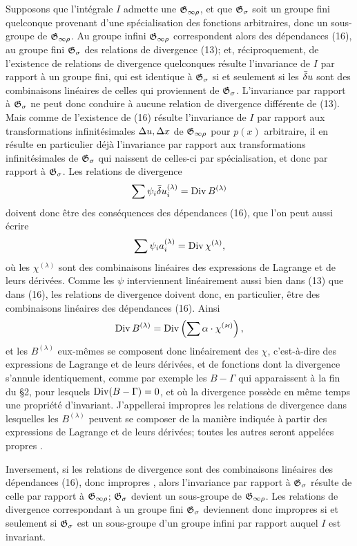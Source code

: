 Supposons que l'intégrale \(I\) admette une \(\mathfrak G_{\infty\rho}\), et que \(\mathfrak G_\sigma\) soit un groupe fini quelconque provenant d'une spécialisation des fonctions arbitraires, donc un sous-groupe de \(\mathfrak G_{\infty\rho}\). Au groupe infini \(\mathfrak G_{\infty\rho}\) correspondent alors des dépendances (16), au groupe fini \(\mathfrak G_\sigma\) des relations de divergence (13); et, réciproquement, de l'existence de relations de divergence quelconques résulte l'invariance de \(I\) par rapport à un groupe fini, qui est identique à \(\mathfrak G_\sigma\) si et seulement si les \(\bar{\delta} u\) sont des combinaisons linéaires de celles qui proviennent de \(\mathfrak G_\sigma\). L'invariance par rapport à \(\mathfrak G_\sigma\) ne peut donc conduire à aucune relation de divergence différente de (13). Mais comme de l'existence de (16) résulte l'invariance de \(I\) par rapport aux transformations infinitésimales \(\Delta u,\Delta x\) de \(\mathfrak G_{\infty\rho}\) pour \(p(x)\) arbitraire, il en résulte en particulier déjà l'invariance par rapport aux transformations infinitésimales de \(\mathfrak G_\sigma\) qui naissent de celles-ci par spécialisation, et donc par rapport à \(\mathfrak G_\sigma\). Les relations de divergence
\[
\sum\psi_i\bar{\delta} u_i^{(\lambda)}=\operatorname{Div} B^{(\lambda)}
\]
doivent donc être des conséquences des dépendances (16), que l'on peut aussi écrire
\[
\sum\psi_i a_i^{(\lambda)}=\operatorname{Div}\chi^{(\lambda)},
\]
où les \(\chi^{(\lambda)}\) sont des combinaisons linéaires des expressions de Lagrange et de leurs dérivées. Comme les \(\psi\) interviennent linéairement aussi bien dans (13) que dans (16), les relations de divergence doivent donc, en particulier, être des combinaisons linéaires des dépendances (16). Ainsi
\[
\operatorname{Div} B^{(\lambda)}=\operatorname{Div}\left(\sum \alpha\cdot\chi^{(\varkappa)}\right),
\]
et les \(B^{(\lambda)}\) eux-mêmes se composent donc linéairement des \(\chi\), c'est-à-dire des expressions de Lagrange et de leurs dérivées, et de fonctions dont la divergence s'annule identiquement, comme par exemple les \(B-\Gamma\) qui apparaissent à la fin du \S{}2, pour lesquels \(\operatorname{Div}(B-\Gamma)=0\), et où la divergence possède en même temps une propriété d'invariant. J'appellerai \og impropres \fg{} les relations de divergence dans lesquelles les \(B^{(\lambda)}\) peuvent se composer de la manière indiquée à partir des expressions de Lagrange et de leurs dérivées; toutes les autres seront appelées \og propres \fg{}.

Inversement, si les relations de divergence sont des combinaisons linéaires des dépendances (16), donc \og impropres \fg{}, alors l'invariance par rapport à \(\mathfrak G_\sigma\) résulte de celle par rapport à \(\mathfrak G_{\infty\rho}\); \(\mathfrak G_\sigma\) devient un sous-groupe de \(\mathfrak G_{\infty\rho}\). Les relations de divergence correspondant à un groupe fini \(\mathfrak G_\sigma\) deviennent donc impropres si et seulement si \(\mathfrak G_\sigma\) est un sous-groupe d'un groupe infini par rapport auquel \(I\) est invariant.

